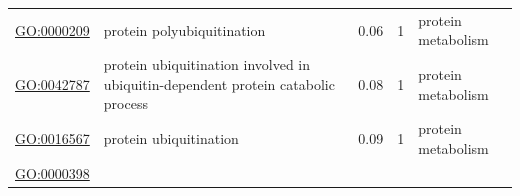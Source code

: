 \documentclass[
]{article}
\begin{document}
\begin{longtable}[]{@{}lllll@{}}
\begin{minipage}[t]{0.17\columnwidth}
\url{GO:0000209}\strut
\end{minipage} & \begin{minipage}[t]{0.17\columnwidth}\raggedright
protein polyubiquitination\strut
\end{minipage} & \begin{minipage}[t]{0.17\columnwidth}\raggedright
0.06\strut
\end{minipage} & \begin{minipage}[t]{0.17\columnwidth}\raggedright
1\strut
\end{minipage} & \begin{minipage}[t]{0.17\columnwidth}\raggedright
protein metabolism\strut
\end{minipage}\tabularnewline
\begin{minipage}[t]{0.17\columnwidth}\raggedright
\url{GO:0042787}\strut
\end{minipage} & \begin{minipage}[t]{0.17\columnwidth}\raggedright
protein ubiquitination involved in ubiquitin-dependent protein catabolic
process\strut
\end{minipage} & \begin{minipage}[t]{0.17\columnwidth}\raggedright
0.08\strut
\end{minipage} & \begin{minipage}[t]{0.17\columnwidth}\raggedright
1\strut
\end{minipage} & \begin{minipage}[t]{0.17\columnwidth}\raggedright
protein metabolism\strut
\end{minipage}\tabularnewline
\begin{minipage}[t]{0.17\columnwidth}\raggedright
\url{GO:0016567}\strut
\end{minipage} & \begin{minipage}[t]{0.17\columnwidth}\raggedright
protein ubiquitination\strut
\end{minipage} & \begin{minipage}[t]{0.17\columnwidth}\raggedright
0.09\strut
\end{minipage} & \begin{minipage}[t]{0.17\columnwidth}\raggedright
1\strut
\end{minipage} & \begin{minipage}[t]{0.17\columnwidth}\raggedright
protein metabolism\strut
\end{minipage}\tabularnewline
\begin{minipage}[t]{0.17\columnwidth}\raggedright
\url{GO:0000398}\strut

\end{minipage}
\end{longtable}
\end{document}
